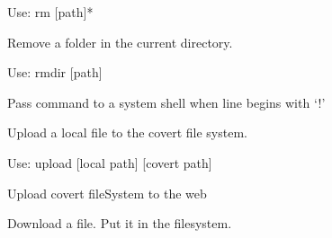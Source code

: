 \documentclass[letterpaper,12pt,openany,oneside]{sphinxmanual}
\begin{document}
\begin{fulllineitems}
\begin{fulllineitems}
Use: rm {[}path{]}*

\end{fulllineitems}


\begin{fulllineitems}
\label{main:main.Console.do_rmdir}
Remove a folder in the current directory.

Use: rmdir {[}path{]}

\end{fulllineitems}


\begin{fulllineitems}
\label{main:main.Console.do_shell}
Pass command to a system shell when line begins with `!'

\end{fulllineitems}


\begin{fulllineitems}
\label{main:main.Console.do_upload}
Upload a local file to the covert file system.

Use: upload {[}local path{]} {[}covert path{]}

\end{fulllineitems}


\begin{fulllineitems}
\label{main:main.Console.do_uploadfs}
Upload covert fileSystem to the web

\end{fulllineitems}


\begin{fulllineitems}
\label{main:main.Console.down_and_set_file}
Download a file. Put it in the filesystem.

\end{fulllineitems}



\end{fulllineitems}
\end{document}
